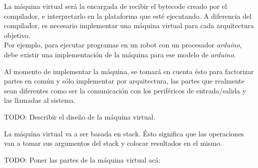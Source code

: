   
  La máquina virtual será la encargada de recibir el bytecode creado por
el compilador, e interpretarlo en la plataforma que esté ejecutando.
  A diferencia del compilador, es necesario implementar una máquina virtual
para cada arquitectura objetivo.\\

  Por ejemplo, para ejecutar programas en un robot
  con un procesador \emph{arduino}, debe
  existir una implementación de la máquina para ese modelo
  de \emph{arduino}.

  Al momento de implementar la máquina, se tomará en cuenta ésto para
  factorizar partes en común y sólo implementar por arquitectura, las
  partes que realmente sean diferentes como ser la comunicación con
  los periféricos de entrada/salida y las llamadas al sistema.


  TODO: Describir el diseño de la máquina virtual.

  La máquina virtual va a ser basada en stack. Ésto significa
que las operaciones van a tomar sus argumentos del stack y
colocar resultados en el mismo.


  TODO: Poner las partes de la máquina virtual acá:


